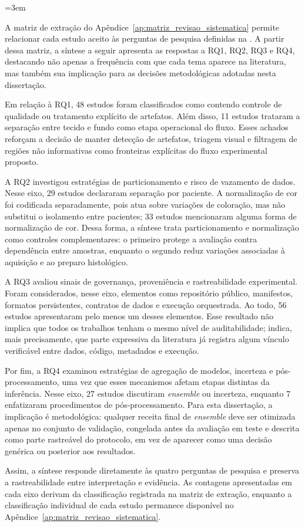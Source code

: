 \begingroup
\emergencystretch=3em
\sloppy

A matriz de extração do Apêndice~\ref{ap:matriz_revisao_sistematica}
permite relacionar cada estudo aceito às perguntas de pesquisa definidas na
. A partir dessa matriz, a síntese a
seguir apresenta as respostas a RQ1, RQ2, RQ3 e RQ4, destacando não apenas a
frequência com que cada tema aparece na literatura, mas também sua implicação
para as decisões metodológicas adotadas nesta dissertação.

Em relação à RQ1, 48 estudos foram classificados como contendo controle de
qualidade ou tratamento explícito de artefatos. Além disso, 11 estudos trataram
a separação entre tecido e fundo como etapa operacional do fluxo. Esses achados
reforçam a decisão de manter detecção de artefatos, triagem visual e filtragem
de regiões não informativas como fronteiras explícitas do fluxo experimental
proposto.

A RQ2 investigou estratégias de particionamento e risco de vazamento de dados.
Nesse eixo, 29 estudos declararam separação por paciente. A normalização de cor
foi codificada separadamente, pois atua sobre variações de coloração, mas não
substitui o isolamento entre pacientes; 33 estudos mencionaram alguma forma de
normalização de cor. Dessa forma, a síntese trata particionamento e
normalização como controles complementares: o primeiro protege a avaliação contra
dependência entre amostras, enquanto o segundo reduz variações associadas à
aquisição e ao preparo histológico.

A RQ3 avaliou sinais de governança, proveniência e rastreabilidade
experimental. Foram considerados, nesse eixo, elementos como repositório
público, manifestos, formatos persistentes, contratos de dados e execução
orquestrada. Ao todo, 56 estudos apresentaram pelo menos um desses elementos.
Esse resultado não implica que todos os trabalhos tenham o mesmo nível de
auditabilidade; indica, mais precisamente, que parte expressiva da literatura já
registra algum vínculo verificável entre dados, código, metadados e execução.

Por fim, a RQ4 examinou estratégias de agregação de modelos, incerteza e
pós-processamento, uma vez que esses mecanismos afetam etapas distintas da
inferência. Nesse eixo, 27 estudos discutiram \textit{ensemble} ou incerteza,
enquanto 7 enfatizaram procedimentos de pós-processamento. Para esta
dissertação, a implicação é metodológica: qualquer receita final de
\textit{ensemble} deve ser otimizada apenas no conjunto de validação, congelada
antes da avaliação em teste e descrita como parte rastreável do protocolo, em
vez de aparecer como uma decisão genérica ou posterior aos resultados.

Assim, a síntese responde diretamente às quatro perguntas de pesquisa e preserva
a rastreabilidade entre interpretação e evidência. As contagens apresentadas em
cada eixo derivam da classificação registrada na matriz de extração, enquanto a
classificação individual de cada estudo permanece disponível no
Apêndice~\ref{ap:matriz_revisao_sistematica}.

\fussy
\endgroup
